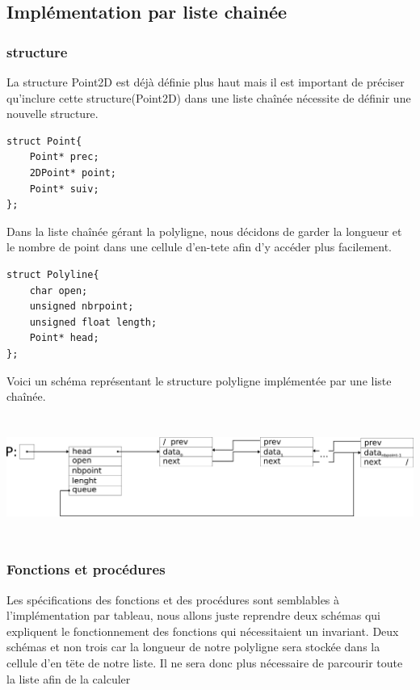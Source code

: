 \documentclass[a4paper, 11pt, oneside]{article}
\begin{document}
\subsection{Implémentation par liste chainée}

\subsubsection{structure}

La structure Point2D est déjà définie plus haut mais il  est important de préciser qu'inclure cette structure(Point2D) dans une liste chaînée nécessite de définir une nouvelle structure. 

\begin{lstlisting}
struct Point{
    Point* prec;
    2DPoint* point;
    Point* suiv;
};
\end{lstlisting}


Dans la liste chaînée gérant la polyligne, nous décidons de garder la longueur et le nombre de point dans une cellule d'en-tete afin d'y accéder plus facilement.
\begin{lstlisting}
struct Polyline{
	char open;
	unsigned nbrpoint;
	unsigned float length;
	Point* head;
};
\end{lstlisting}

Voici un schéma représentant le structure polyligne implémentée par une liste chaînée.

\includegraphics[height=4cm, width=14cm]{schemalist.png}

\subsubsection{Fonctions et procédures}

Les spécifications des fonctions et des procédures sont semblables à l'implémentation par tableau, nous allons juste reprendre deux schémas qui expliquent le fonctionnement des fonctions qui nécessitaient un invariant. Deux schémas et non trois car la longueur de notre polyligne sera stockée dans la cellule d'en tëte de notre liste. Il ne sera donc plus nécessaire de parcourir toute la liste afin de la calculer
\end{document}
